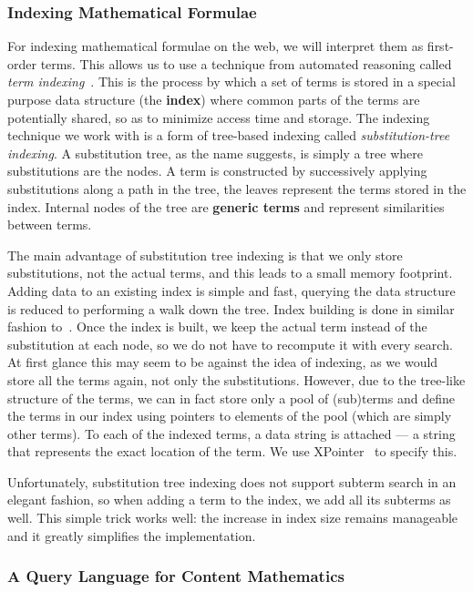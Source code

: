 \subsubsection{Indexing Mathematical Formulae}

For indexing mathematical formulae on the web, we will interpret them as first-order
terms. This allows us to use a technique from automated reasoning called {\emph{term
    indexing}}~\cite{Graf:ti96}. This is the process by which a set of terms is stored in
a special purpose data structure (the {\bf{index}}) where common parts of the terms are
potentially shared, so as to minimize access time and storage. The indexing technique we
work with is a form of tree-based indexing called {\emph{substitution-tree indexing}}. A
substitution tree, as the name suggests, is simply a tree where substitutions are the
nodes. A term is constructed by successively applying substitutions along a path in the
tree, the leaves represent the terms stored in the index. Internal nodes of the tree are
{\bf{generic terms}} and represent similarities between terms.

The main advantage of substitution tree indexing is that we only store substitutions, not
the actual terms, and this leads to a small memory footprint.  Adding data to an existing
index is simple and fast, querying the data structure is reduced to performing a walk down
the tree.  Index building is done in similar fashion to~\cite{Graf:ti96}. Once the index
is built, we keep the actual term instead of the substitution at each node, so we do not
have to recompute it with every search. At first glance this may seem to be against the
idea of indexing, as we would store all the terms again, not only the
substitutions. However, due to the tree-like structure of the terms, we can in fact store
only a pool of (sub)terms and define the terms in our index using pointers to elements of
the pool (which are simply other terms). To each of the indexed terms, a data string is
attached --- a string that represents the exact location of the term. We use
XPointer~\cite{GroMal:xf03} to specify this.

Unfortunately, substitution tree indexing does not support subterm search in an elegant
fashion, so when adding a term to the index, we add all its subterms as well. This simple
trick works well: the increase in index size remains manageable and it greatly simplifies
the implementation.

\subsubsection{A Query Language for Content Mathematics}\label{sec:query}

